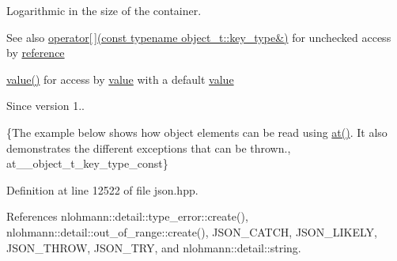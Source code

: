Logarithmic in the size of the container.

\begin{DoxySeeAlso}{See also}
\hyperlink{classnlohmann_1_1basic__json_a233b02b0839ef798942dd46157cc0fe6}{operator\mbox{[}$\,$\mbox{]}(const typename object\+\_\+t\+::key\+\_\+type\&)} for unchecked access by \hyperlink{classnlohmann_1_1basic__json_ac6a5eddd156c776ac75ff54cfe54a5bc}{reference} 

\hyperlink{classnlohmann_1_1basic__json_adcf8ca5079f5db993820bf50036bf45d}{value()} for access by \hyperlink{classnlohmann_1_1basic__json_adcf8ca5079f5db993820bf50036bf45d}{value} with a default \hyperlink{classnlohmann_1_1basic__json_adcf8ca5079f5db993820bf50036bf45d}{value}
\end{DoxySeeAlso}
\begin{DoxySince}{Since}
version 1..
\end{DoxySince}
\{The example below shows how object elements can be read using {\ttfamily \hyperlink{classnlohmann_1_1basic__json_a73ae333487310e3302135189ce8ff5d8}{at()}}. It also demonstrates the different exceptions that can be thrown., at\+\_\+\+\_\+object\+\_\+t\+\_\+key\+\_\+type\+\_\+const\} 

Definition at line 12522 of file json.\+hpp.



References nlohmann\+::detail\+::type\+\_\+error\+::create(), nlohmann\+::detail\+::out\+\_\+of\+\_\+range\+::create(), J\+S\+O\+N\+\_\+\+C\+A\+T\+CH, J\+S\+O\+N\+\_\+\+L\+I\+K\+E\+LY, J\+S\+O\+N\+\_\+\+T\+H\+R\+OW, J\+S\+O\+N\+\_\+\+T\+RY, and nlohmann\+::detail\+::string.


